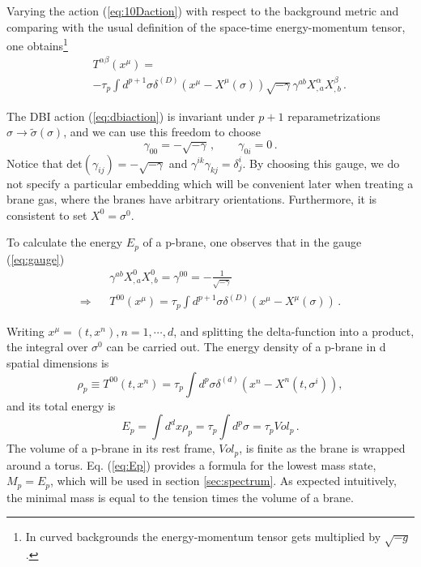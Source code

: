 \documentclass[a4paper,twocolumn,nofootinbib,tightenlines,prd,aps,
               superscriptaddress]{revtex4} %
\newcommand{\al}{\alpha}
\newcommand{\be}{\beta}
\newcommand{\si}{\sigma}
\newcommand{\ga}{\gamma}
\newcommand{\de}{\delta}
\newcommand{\nn}{\nonumber}
\begin{document}
Varying the action (\ref{eq:10Daction}) with respect to the
background metric and comparing with the usual definition of the
space-time energy-momentum tensor, one obtains\footnote{In curved
backgrounds the energy-momentum tensor gets multiplied by
$\sqrt{-g}$.}
\begin{eqnarray}\label{eq:emtensor}
    &&T^{\al\be}(x^{\mu}) = \\
    &&-\tau_p \int d^{p+1}\si \delta^{(D)}(x^\mu-X^\mu(\si))\sqrt{-\ga}
    \ga^{ab} X^\al_{,a} X^\be_{,b}\,.\nn
\end{eqnarray}

The DBI action (\ref{eq:dbiaction}) is invariant under $p+1$
reparametrizations $\si \rightarrow \tilde{\si}(\si)$, and we can
use this freedom to choose
\begin{equation}\label{eq:gauge}
    \ga_{00} = -\sqrt{-\ga}\,, \qquad \ga_{0i} = 0\,.
\end{equation}
Notice that $\mbox{det}(\ga_{ij}) = -\sqrt{-\ga}$ and
$\ga^{ik}\ga_{kj}=\de^i_j$. By choosing this gauge, we do not
specify a particular embedding which will be convenient later when
treating a brane gas, where the branes have arbitrary
orientations. Furthermore, it is consistent to set $X^0 = \si^0$.


To calculate the energy $E_p$ of a p-brane, one observes that in
the gauge (\ref{eq:gauge})
\begin{eqnarray}
    &&\ga^{ab} X^0_{,a} X^0_{,b}=\ga^{00}=-\frac{1}{\sqrt{-\ga}}\nn\\
    \Rightarrow && T^{00} (x^\mu) = \tau_p \int d^{p+1}\si
    \de^{(D)}(x^\mu-X^\mu (\si))\,.
\end{eqnarray}

Writing $x^\mu = (t,x^n), n=1,\cdots,d$, and splitting the
delta-function into a product, the integral over $\si^0$ can be
carried out. The energy density of a p-brane in d spatial
dimensions is
\begin{equation}\label{eq:finalrho}
    \rho_p \equiv T^{00} (t,x^n) =  \tau_p \int d^p\si
    \de^{(d)}(x^n-X^n(t,\si^i)),
\end{equation}
and its total energy is
\begin{equation}\label{eq:Ep}
    E_p = \int d^d x \rho_p = \tau_p \int d^p \si = \tau_p
    Vol_p\,.
\end{equation}
The volume of a p-brane in its rest frame, $Vol_p$, is finite as
the brane is wrapped around a torus. Eq. (\ref{eq:Ep}) provides a
formula for the lowest mass state, $M_p = E_p$, which will be used
in section \ref{sec:spectrum}. As expected intuitively, the
minimal mass is equal to the tension times the volume of a brane.
\end{document}
